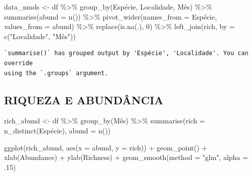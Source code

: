 \documentclass[
  letterpaper,
  DIV=11,
  numbers=noendperiod]{scrartcl}
\newenvironment{Shaded}{\begin{snugshade}}{\end{snugshade}}
\newcommand{\AttributeTok}[1]{\textcolor[rgb]{0.40,0.45,0.13}{#1}}
\newcommand{\DecValTok}[1]{\textcolor[rgb]{0.68,0.00,0.00}{#1}}
\newcommand{\FunctionTok}[1]{\textcolor[rgb]{0.28,0.35,0.67}{#1}}
\newcommand{\NormalTok}[1]{\textcolor[rgb]{0.00,0.23,0.31}{#1}}
\newcommand{\OtherTok}[1]{\textcolor[rgb]{0.00,0.23,0.31}{#1}}
\newcommand{\SpecialCharTok}[1]{\textcolor[rgb]{0.37,0.37,0.37}{#1}}
\newcommand{\StringTok}[1]{\textcolor[rgb]{0.13,0.47,0.30}{#1}}
\begin{document}
\begin{Shaded}
\begin{Highlighting}[]
\NormalTok{data\_nmds }\OtherTok{\textless{}{-}} 
\NormalTok{  df }\SpecialCharTok{\%\textgreater{}\%}
  \FunctionTok{group\_by}\NormalTok{(Espécie, Localidade, Mês) }\SpecialCharTok{\%\textgreater{}\%}
  \FunctionTok{summarise}\NormalTok{(}\AttributeTok{abund =} \FunctionTok{n}\NormalTok{()) }\SpecialCharTok{\%\textgreater{}\%}
  \FunctionTok{pivot\_wider}\NormalTok{(}\AttributeTok{names\_from =}\NormalTok{ Espécie, }\AttributeTok{values\_from =}\NormalTok{ abund) }\SpecialCharTok{\%\textgreater{}\%}
  \FunctionTok{replace}\NormalTok{(}\FunctionTok{is.na}\NormalTok{(.), }\DecValTok{0}\NormalTok{) }\SpecialCharTok{\%\textgreater{}\%}
  \FunctionTok{left\_join}\NormalTok{(rich, }\AttributeTok{by =} \FunctionTok{c}\NormalTok{(}\StringTok{"Localidade"}\NormalTok{, }\StringTok{"Mês"}\NormalTok{))}
\end{Highlighting}
\end{Shaded}

\begin{verbatim}
`summarise()` has grouped output by 'Espécie', 'Localidade'. You can override
using the `.groups` argument.
\end{verbatim}

\hypertarget{riqueza-e-abunduxe2ncia}{%
\subsection{RIQUEZA E ABUNDÂNCIA}\label{riqueza-e-abunduxe2ncia}}

\begin{Shaded}
\begin{Highlighting}[]
\NormalTok{rich\_abund }\OtherTok{\textless{}{-}} 
\NormalTok{  df }\SpecialCharTok{\%\textgreater{}\%}
  \FunctionTok{group\_by}\NormalTok{(Mês) }\SpecialCharTok{\%\textgreater{}\%}
  \FunctionTok{summarise}\NormalTok{(}\AttributeTok{rich =} \FunctionTok{n\_distinct}\NormalTok{(}\StringTok{\textasciigrave{}}\AttributeTok{Espécie}\StringTok{\textasciigrave{}}\NormalTok{),}
            \AttributeTok{abund =} \FunctionTok{n}\NormalTok{())}

\FunctionTok{ggplot}\NormalTok{(rich\_abund, }\FunctionTok{aes}\NormalTok{(}\AttributeTok{x =}\NormalTok{ abund, }\AttributeTok{y =}\NormalTok{ rich)) }\SpecialCharTok{+}
  \FunctionTok{geom\_point}\NormalTok{() }\SpecialCharTok{+}
  \FunctionTok{xlab}\NormalTok{(}\StringTok{\textquotesingle{}Abundance\textquotesingle{}}\NormalTok{) }\SpecialCharTok{+}
  \FunctionTok{ylab}\NormalTok{(}\StringTok{\textquotesingle{}Richness\textquotesingle{}}\NormalTok{) }\SpecialCharTok{+}
  \FunctionTok{geom\_smooth}\NormalTok{(}\AttributeTok{method =} \StringTok{"glm"}\NormalTok{, }\AttributeTok{alpha =}\NormalTok{ .}\DecValTok{15}\NormalTok{) }
\end{Highlighting}
\end{Shaded}
\end{document}
